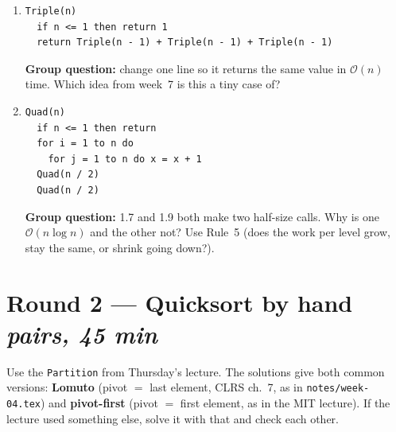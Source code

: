\documentclass{fkt-notes}
\newcommand{\Oh}{\mathcal{O}}
\begin{document}
\begin{enumerate}[label=\textbf{1.\arabic*},leftmargin=2.5em]
\item \begin{lstlisting}
Triple(n)
  if n <= 1 then return 1
  return Triple(n - 1) + Triple(n - 1) + Triple(n - 1)
\end{lstlisting}
\textbf{Group question:} change one line so it returns the same value in $\Oh(n)$ time. Which idea from week~7 is this a tiny case of?

\item \begin{lstlisting}
Quad(n)
  if n <= 1 then return
  for i = 1 to n do
    for j = 1 to n do x = x + 1
  Quad(n / 2)
  Quad(n / 2)
\end{lstlisting}
\textbf{Group question:} 1.7 and 1.9 both make two half-size calls. Why is one $\Oh(n\log n)$ and the other not? Use Rule~5 (does the work per level grow, stay the same, or shrink going down?).
\end{enumerate}

\section*{Round 2 --- Quicksort by hand \hfill\normalsize\emph{pairs, 45 min}}

Use the \texttt{Partition} from Thursday's lecture. The solutions give both common versions: \textbf{Lomuto} (pivot $=$ last element, CLRS ch.~7, as in \texttt{notes/week-04.tex}) and \textbf{pivot-first} (pivot $=$ first element, as in the MIT lecture). If the lecture used something else, solve it with that and check each other.
\end{document}
